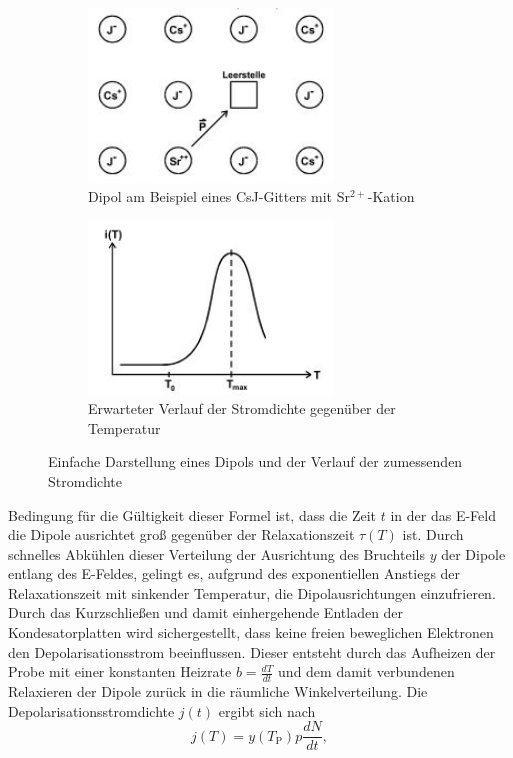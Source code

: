  \begin{figure}[H]
 \centering
 \begin{subfigure}{0.49\textwidth}
 \centering
 \includegraphics[width=6.5cm]{kristall.JPG}
 \caption{Dipol am Beispiel eines CsJ-Gitters mit Sr$^{2+}$-Kation \cite{V48}}
 \label{fig:aufbau}
 \end{subfigure}
 \begin{subfigure}{0.49\textwidth}
 \centering
 \includegraphics[width=6.5cm]{verlauf.JPG}
 \caption{Erwarteter Verlauf der Stromdichte gegenüber der Temperatur \cite{V48}}
 \label{fig:kurv}
 \end{subfigure}
 \caption{Einfache Darstellung eines Dipols und der Verlauf der zumessenden Stromdichte}
 \end{figure}
 Bedingung für die Gültigkeit dieser Formel ist, dass die Zeit $t$ in der das E-Feld
 die Dipole ausrichtet groß gegenüber der Relaxationszeit $\tau(T)$ ist.
Durch schnelles Abkühlen dieser Verteilung der Ausrichtung des Bruchteils $y$ der Dipole entlang des E-Feldes, gelingt es, aufgrund des exponentiellen Anstiegs
der Relaxationszeit mit sinkender Temperatur, die Dipolausrichtungen einzufrieren.
Durch das Kurzschließen und damit einhergehende Entladen der
Kondesatorplatten wird sichergestellt, dass keine freien beweglichen Elektronen den Depolarisationsstrom beeinflussen.
Dieser entsteht durch das Aufheizen der Probe mit einer konstanten Heizrate $b=\frac{dT}{dt}$ und dem damit verbundenen Relaxieren der Dipole zurück in die räumliche Winkelverteilung.
Die Depolarisationsstromdichte $j(t)$ ergibt sich nach
\begin{equation}
  j(T) = y(T_\text{P}) p \frac{dN}{dt},
\label{eqn:strom}
\end{equation}
